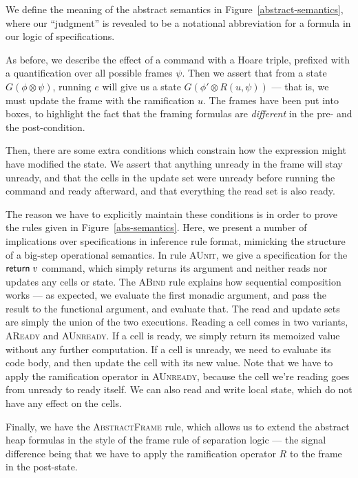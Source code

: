 \documentclass[preprint,natbib]{sigplanconf}
\begin{document}
We define the meaning of the abstract semantics in
Figure~\ref{abstract-semantics}, where our ``judgment'' is revealed to 
be a notational abbreviation for a formula in our logic of specifications.

As before, we describe the effect of a command with a Hoare triple,
prefixed with a quantification over all possible frames $\psi$. Then
we assert that from a state $G(\phi \otimes \psi)$, running $e$ will
give us a state $G(\phi' \otimes R(u, \psi))$ --- that is, we must
update the frame with the ramification $u$. The frames have been put
into boxes, to highlight the fact that the framing formulas are
\emph{different} in the pre- and the post-condition.

Then, there are some extra conditions which constrain how the
expression might have modified the state. We assert that anything
unready in the frame will stay unready, and that the cells in the
update set were unready before running the command and ready afterward,
and that everything the read set is also ready. 

The reason we have to explicitly maintain these conditions is in order
to prove the rules given in Figure~\ref{abs-semantics}. Here, we
present a number of implications over specifications in inference rule
format, mimicking the structure of a big-step operational semantics. 
In rule \textsc{AUnit}, we give a specification for the $\mbox{\textsf{{return}}}\; v$ command, 
which simply returns its argument and neither reads nor updates any 
cells or state. The \textsc{ABind} rule explains how sequential composition 
works --- as expected, we evaluate the first monadic argument, and pass
the result to the functional argument, and evaluate that. The read and
update sets are simply the union of the two executions. Reading a cell
comes in two variants, \textsc{AReady} and \textsc{AUnready}. If a cell is ready, we
simply return its memoized value without any further computation. If
a cell is unready, we need to evaluate its code body, and then update
the cell with its new value. Note that we have to apply the ramification
operator in \textsc{AUnready}, because the cell we're reading goes from unready
to ready itself. We can also read and write local state, which do not have any
effect on the cells. 

Finally, we have the \textsc{AbstractFrame} rule, which allows us to
extend the abstract heap formulas in the style of the frame rule of 
separation logic --- the signal difference being that we have to apply 
the ramification operator $R$ to the frame in the post-state. 
\end{document}

